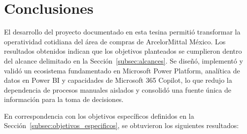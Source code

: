 
\section{Conclusiones} \label{sec:conclusiones} %

El desarrollo del proyecto documentado en esta tesina permitió transformar la operatividad cotidiana del área de compras de ArcelorMittal México. Los resultados obtenidos indican que los objetivos planteados se cumplieron dentro del alcance delimitado en la Sección~\ref{subsec:alcances}. Se diseñó, implementó y validó un ecosistema fundamentado en Microsoft Power Platform, analítica de datos en Power BI y capacidades de Microsoft 365 Copilot, lo que redujo la dependencia de procesos manuales aislados y consolidó una fuente única de información para la toma de decisiones.

En correspondencia con los objetivos específicos definidos en la Sección~\ref{subsec:objetivos_especificos}, se obtuvieron los siguientes resultados:

